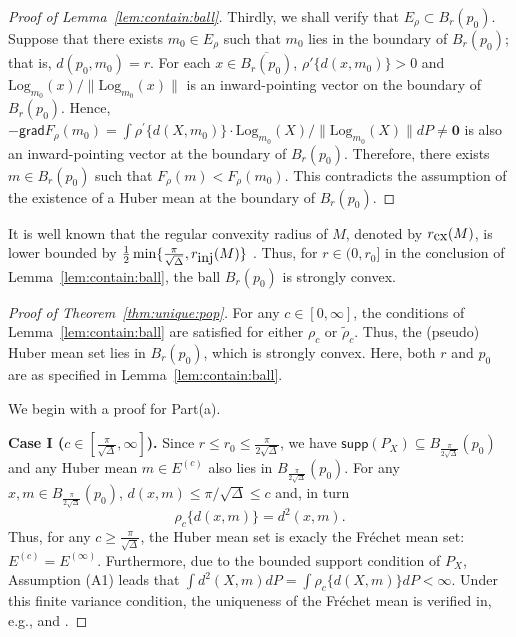 \documentclass[preprint]{imsart}
\theoremstyle{plain}
\theoremstyle{remark}
\begin{document}
\begin{appendix}
\begin{proof}[Proof of Lemma~\ref{lem:contain:ball}]
Thirdly, we shall verify that $E_{\rho} \subset B_{r}(p_0)$. Suppose that there exists $m_0 \in E_{\rho}$ such that $m_0$ lies in the boundary of $B_{r}(p_0)$; that is, $d(p_0, m_0)=r$. For each $x \in \overline{B_{r}(p_0)}$, $\rho'\{d(x, m_0)\} >0$ and $\mbox{Log}_{m_{0}}(x)/\|\mbox{Log}_{m_{0}}(x)\|$ is an inward-pointing vector on the boundary of $B_{r}(p_0)$. Hence, $-\textsf{grad}F_\rho(m_0)= \int \rho^{'}\{d(X, m_0)\} \cdot \mbox{Log}_{m_0}(X)/\|\mbox{Log}_{m_0}(X)\|dP \neq \mathbf{0}$ is also an inward-pointing vector at the boundary of $B_{r}(p_0)$. Therefore, there exists $m \in B_{r}(p_0)$ such that $F_\rho(m) < F_\rho(m_0)$. This contradicts the assumption of the existence of a Huber mean at the boundary of $B_r(p_0)$. 
\end{proof}


It is well known that the regular convexity radius of $M$, denoted by $r_{\mbox{\tiny cx}}(M)$, is lower bounded by $\frac{1}{2} \min\{\frac{\pi}{\sqrt{\Delta}}, r_{\mbox{\tiny inj}}(M)\}$ \citep[cf.][]{afsari2013convergence}. Thus, for $r \in (0,r_0]$ in the conclusion of Lemma~\ref{lem:contain:ball}, the ball $B_r(p_0)$ is strongly convex. 




\begin{proof}[Proof of Theorem~\ref{thm:unique:pop}]
For any $c \in [0,\infty]$, the conditions of Lemma~\ref{lem:contain:ball} are satisfied for either $\rho_c$ or $\tilde{\rho}_c$. Thus, the (pseudo) Huber mean set lies in $B_r(p_0)$, which is strongly convex. Here, both $r$ and $p_0$ are as specified in Lemma~\ref{lem:contain:ball}.

We begin with a proof for Part(a). 


 

\textbf{Case I ($c \in [\tfrac{\pi}{\sqrt{\Delta}},\infty]$).} 
Since $r \le r_0 \le \frac{\pi}{2\sqrt{\Delta}}$, we have $\textsf{supp}(P_{X}) \subseteq B_{\frac{\pi}{2\sqrt{\Delta}}}(p_0)$ and any Huber mean $m \in E^{(c)}$ also lies in $B_{\frac{\pi}{2\sqrt{\Delta}}}(p_0)$. For any $x,m \in B_{\frac{\pi}{2\sqrt{\Delta}}}(p_0)$, $d(x,m) \le \pi/ \sqrt{\Delta} \le c$ and, in turn $$\rho_c\{d(x,m)\} = d^2(x, m).$$
Thus, for any $c \ge \tfrac{\pi}{\sqrt{\Delta}}$, the Huber mean set is exacly the Fr\'{e}chet mean set: $E^{(c)} = E^{(\infty)}$. Furthermore, due to the bounded support condition of $P_{X}$, Assumption (A1) leads that $\int d^2(X,m) dP =  \int \rho_c\{d(X,m)\} dP  < \infty $. Under this finite variance condition, the uniqueness of the Fr\'{e}chet mean is verified in, e.g., \citep[Theorem 2.1,][]{afsari2011riemannian} and \citep[Proposition 4.3,][]{sturm2003probability}.




\end{proof}
\end{appendix}
\end{document}
